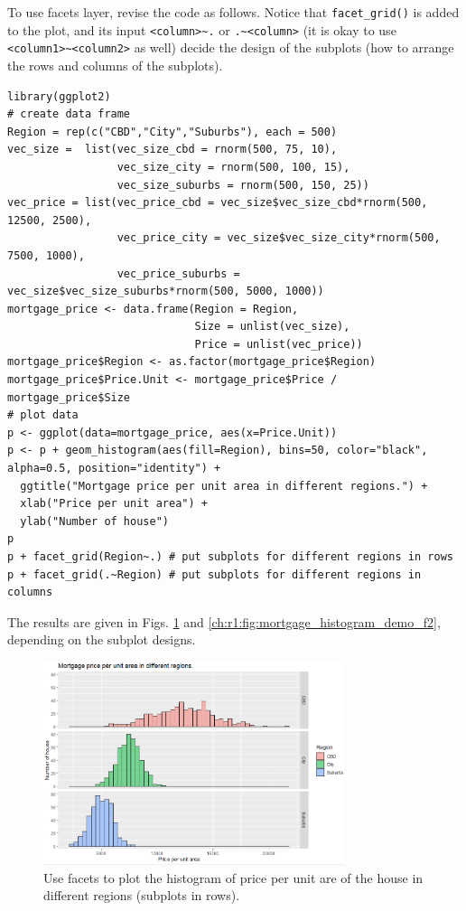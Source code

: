To use facets layer, revise the code as follows. Notice that \verb|facet_grid()| is added to the plot, and its input \verb|<column>~.| or \verb|.~<column>| (it is okay to use \verb|<column1>~<column2>| as well) decide the design of the subplots (how to arrange the rows and columns of the subplots).
\begin{lstlisting}
library(ggplot2)
# create data frame
Region = rep(c("CBD","City","Suburbs"), each = 500)
vec_size =  list(vec_size_cbd = rnorm(500, 75, 10),
                 vec_size_city = rnorm(500, 100, 15),
                 vec_size_suburbs = rnorm(500, 150, 25))
vec_price = list(vec_price_cbd = vec_size$vec_size_cbd*rnorm(500, 12500, 2500),
                 vec_price_city = vec_size$vec_size_city*rnorm(500, 7500, 1000),
                 vec_price_suburbs = vec_size$vec_size_suburbs*rnorm(500, 5000, 1000))
mortgage_price <- data.frame(Region = Region,
                             Size = unlist(vec_size),
                             Price = unlist(vec_price))
mortgage_price$Region <- as.factor(mortgage_price$Region)
mortgage_price$Price.Unit <- mortgage_price$Price / mortgage_price$Size
# plot data
p <- ggplot(data=mortgage_price, aes(x=Price.Unit))
p <- p + geom_histogram(aes(fill=Region), bins=50, color="black", alpha=0.5, position="identity") +
  ggtitle("Mortgage price per unit area in different regions.") +
  xlab("Price per unit area") +
  ylab("Number of house")
p
p + facet_grid(Region~.) # put subplots for different regions in rows
p + facet_grid(.~Region) # put subplots for different regions in columns
\end{lstlisting}

The results are given in Figs. \ref{ch:r1:fig:mortgage_histogram_demo_f1} and \ref{ch:r1:fig:mortgage_histogram_demo_f2}, depending on the subplot designs.

\begin{figure}
	\centering
	\includegraphics[width=250pt]{chapters/ch-r/figures/mortgage_histogram_demo_f1.png}
	\caption{Use facets to plot the histogram of price per unit are of the house in different regions (subplots in rows).} \label{ch:r1:fig:mortgage_histogram_demo_f1}
\end{figure}

